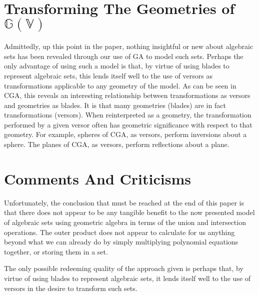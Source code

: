 \documentclass{birkjour}
\theoremstyle{definition}
\theoremstyle{remark}
\numberwithin{equation}{section}
\newcommand{\G}{\mathbb{G}}
\newcommand{\V}{\mathbb{V}}
\begin{document}
\section{Transforming The Geometries of $\G(\V)$}

Admittedly, up this point in the paper, nothing insightful or new about
algebraic sets has been revealed through our use of GA to model
such sets.  Perhaps the only advantage of using such a model
is that, by virtue of using blades to represent algebraic sets,
this lends itself well to the use of versors as transformations
applicable to any geometry of the model.  As can be seen
in CGA, this reveals an interesting relationship
between transformations as versors and geometries as blades.
It is that many geometries (blades) are in fact transformations (versors).
When reinterpreted as a geometry, the transformation performed by a given versor
often has geometric significance with respect to that geometry.
For example, spheres of CGA, as versors, perform inversions about
a sphere.  The planes of CGA, as versors, perform reflections about
a plane.



\section{Comments And Criticisms}

Unfortunately, the conclusion that must be reached at the end of this paper is
that there does not appear to be any tangible benefit to the now
presented model of algebraic sets using geometric algebra in terms
of the union and intersection operations.  The outer product does not
appear to calculate for us anything beyond what we can already
do by simply multiplying polynomial equations together, or storing
them in a set.

The only possible redeeming quality of the approach given is perhaps
that, by virtue of using blades to represent algebraic sets, it lends
itself well to the use of versors in the desire to transform such sets.




\end{document}
